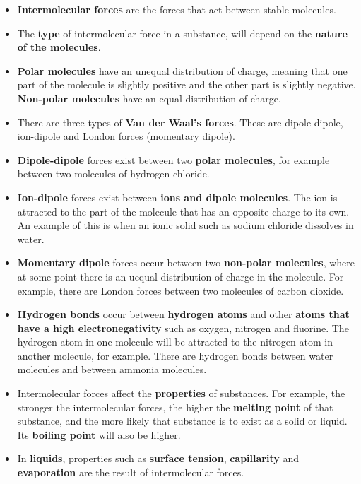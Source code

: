 \begin{itemize}
\item{\textbf{Intermolecular forces} are the forces that act between stable molecules.}
\item{The \textbf{type} of intermolecular force in a substance, will depend on the \textbf{nature of the molecules}.}
\item{\textbf{Polar molecules} have an unequal distribution of charge, meaning that one part of the molecule is slightly positive and the other part is slightly negative. \textbf{Non-polar molecules} have an equal distribution of charge.}
\item{There are three types of \textbf{Van der Waal's forces}. These are dipole-dipole, ion-dipole and London forces (momentary dipole).}
\item{\textbf{Dipole-dipole} forces exist between two \textbf{polar molecules}, for example between two molecules of hydrogen chloride.}
\item{\textbf{Ion-dipole} forces exist between \textbf{ions and dipole molecules}. The ion is attracted to the part of the molecule that has an opposite charge to its own. An example of this is when an ionic solid such as sodium chloride dissolves in water.}
\item{\textbf{Momentary dipole} forces occur between two \textbf{non-polar molecules}, where at some point there is an uequal distribution of charge in the molecule. For example, there are London forces between two molecules of carbon dioxide.}
\item{\textbf{Hydrogen bonds} occur between \textbf{hydrogen atoms} and other \textbf{atoms that have a high electronegativity} such as oxygen, nitrogen and fluorine. The hydrogen atom in one molecule will be attracted to the nitrogen atom in another molecule, for example. There are hydrogen bonds between water molecules and between ammonia molecules.}
\item{Intermolecular forces affect the \textbf{properties} of substances. For example, the stronger the intermolecular forces, the higher the \textbf{melting point} of that substance, and the more likely that substance is to exist as a solid or liquid. Its \textbf{boiling point} will also be higher.}
\item{In \textbf{liquids}, properties such as \textbf{surface tension}, \textbf{capillarity} and \textbf{evaporation} are the result of intermolecular forces.}
\end{itemize}

